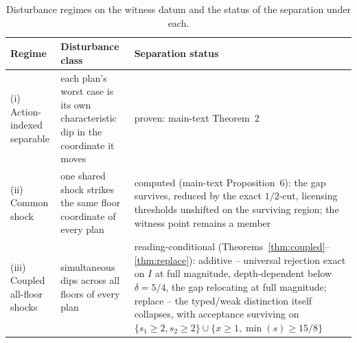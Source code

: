 \begin{table}[!htbp]
\centering\small
\caption{Disturbance regimes on the witness datum and the status of the separation under each.}
\label{tab:disturbance}
\begin{tabularx}{\textwidth}{@{}>{\raggedright\arraybackslash}p{}>{\raggedright\arraybackslash}p{}X@{}}
\toprule
Regime & Disturbance class & Separation status \\
\midrule
(i) Action-indexed separable & each plan's worst case is its own characteristic dip in the coordinate it moves & proven: main-text Theorem~2 \\
(ii) Common shock & one shared shock strikes the same floor coordinate of every plan & computed (main-text Proposition~6): the gap survives, reduced by the exact $1/2$-cut, licensing thresholds unshifted on the surviving region; the witness point remains a member \\
(iii) Coupled all-floor shocks & simultaneous dips across all floors of every plan & reading-conditional (Theorems~\ref{thm:coupled}--\ref{thm:replace}): additive -- universal rejection exact on $I$ at full magnitude, depth-dependent below $\delta=5/4$, the gap relocating at full magnitude; replace -- the typed/weak distinction itself collapses, with acceptance surviving on $\{s_1\ge2,s_2\ge2\}\cup\{x\ge1,\min(s)\ge15/8\}$ \\
\bottomrule
\end{tabularx}
\end{table}

